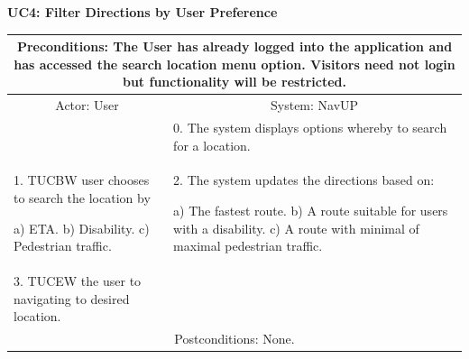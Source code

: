 \documentclass{article}
\begin{document}
        \newpage
				 \vspace{5mm}
                 \begin{flushleft}
                 \textbf{UC4: Filter Directions by User Preference}\\
                  \end{flushleft}
        		\centering	
       		 \small
       		 \begin{tabular}{|p{6cm}|p{6cm}|}
       		 \hline
       		\multicolumn{2}{c}{\parbox{12cm}{\vspace{2mm} Preconditions: The User has already logged into the application and has accessed the search location menu option. Visitors need not login but functionality will be restricted.\vspace{2mm}}} \\
       		 \hline
       		 \multicolumn{1}{c}{Actor: User} & \multicolumn{1}{c}{ System: NavUP} \\
        		\hline
       		 & 0.	The system displays options whereby to search for a location.\\
       		 \hline
       		  1.	TUCBW user chooses to search the location by 

						a)	ETA.
						b)	Disability.
						c)	Pedestrian traffic.
 				& 2.	The system updates the directions based on:

						a)	The fastest route.
						b)	A route suitable for users with a disability.
						c)	A route with minimal of maximal pedestrian traffic.
\\
        		\hline
       		 	3.	TUCEW the user to navigating to desired location. &\\
       		 \hline
        		\multicolumn{2}{c}{Postconditions: None.} \\
        		\hline
        \end{tabular} 
     
\end{document}
